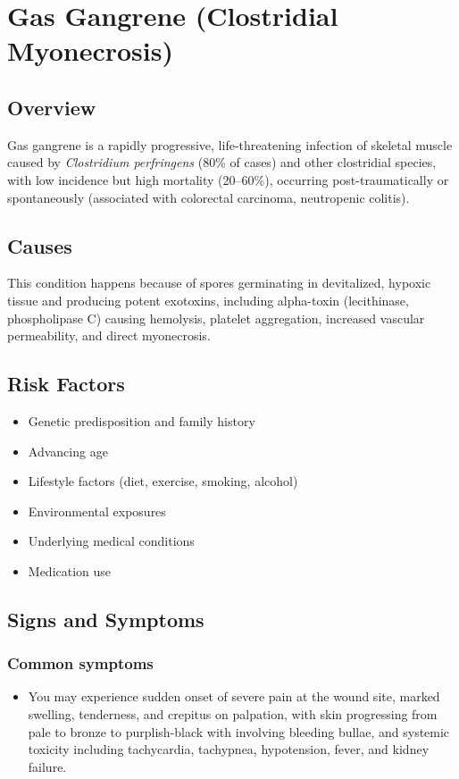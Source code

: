 \chapter{Gas Gangrene (Clostridial Myonecrosis)}
\label{sec:Gas Gangrene}

\section{Overview}
Gas gangrene is a rapidly progressive, life-threatening infection of skeletal muscle caused by \textit{Clostridium perfringens} (80\% of cases) and other clostridial species, with low incidence but high mortality (20--60\%), occurring post-traumatically or spontaneously (associated with colorectal carcinoma, neutropenic colitis).
\section{Causes}
This condition happens because of spores germinating in devitalized, hypoxic tissue and producing potent exotoxins, including alpha-toxin (lecithinase, phospholipase C) causing hemolysis, platelet aggregation, increased vascular permeability, and direct myonecrosis.     
\section{Risk Factors}

\begin{itemize}[noitemsep]
  \item Genetic predisposition and family history
  \item Advancing age
  \item Lifestyle factors (diet, exercise, smoking, alcohol)
  \item Environmental exposures
  \item Underlying medical conditions
  \item Medication use
\end{itemize}
\section{Signs and Symptoms}

\subsection{Common symptoms}
\begin{itemize}[noitemsep]
  \item You may experience sudden onset of severe pain at the wound site, marked swelling, tenderness, and crepitus on palpation, with skin progressing from pale to bronze to purplish-black with involving bleeding bullae, and systemic toxicity including tachycardia, tachypnea, hypotension, fever, and kidney failure. 
  \end{itemize}

